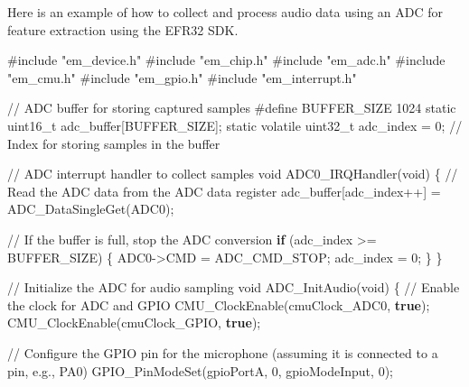 \documentclass[
  9pt,
  letterpaper,
  abstract,
  titlepage]{scrbook}
\newenvironment{Shaded}{\begin{snugshade}}{\end{snugshade}}
\newcommand{\CommentTok}[1]{\textcolor[rgb]{0.37,0.37,0.37}{#1}}
\newcommand{\ControlFlowTok}[1]{\textcolor[rgb]{0.00,0.23,0.31}{\textbf{#1}}}
\newcommand{\DataTypeTok}[1]{\textcolor[rgb]{0.68,0.00,0.00}{#1}}
\newcommand{\DecValTok}[1]{\textcolor[rgb]{0.68,0.00,0.00}{#1}}
\newcommand{\ImportTok}[1]{\textcolor[rgb]{0.00,0.46,0.62}{#1}}
\newcommand{\KeywordTok}[1]{\textcolor[rgb]{0.00,0.23,0.31}{\textbf{#1}}}
\newcommand{\NormalTok}[1]{\textcolor[rgb]{0.00,0.23,0.31}{#1}}
\newcommand{\OperatorTok}[1]{\textcolor[rgb]{0.37,0.37,0.37}{#1}}
\newcommand{\PreprocessorTok}[1]{\textcolor[rgb]{0.68,0.00,0.00}{#1}}
\begin{document}
Here is an example of how to collect and process audio data using an ADC
for feature extraction using the EFR32 SDK.

\begin{Shaded}
\begin{Highlighting}[]
\PreprocessorTok{\#include }\ImportTok{"em\_device.h"}
\PreprocessorTok{\#include }\ImportTok{"em\_chip.h"}
\PreprocessorTok{\#include }\ImportTok{"em\_adc.h"}
\PreprocessorTok{\#include }\ImportTok{"em\_cmu.h"}
\PreprocessorTok{\#include }\ImportTok{"em\_gpio.h"}
\PreprocessorTok{\#include }\ImportTok{"em\_interrupt.h"}

\CommentTok{// ADC buffer for storing captured samples}
\PreprocessorTok{\#define BUFFER\_SIZE }\DecValTok{1024}
\DataTypeTok{static} \DataTypeTok{uint16\_t}\NormalTok{ adc\_buffer}\OperatorTok{[}\NormalTok{BUFFER\_SIZE}\OperatorTok{];}
\DataTypeTok{static} \DataTypeTok{volatile} \DataTypeTok{uint32\_t}\NormalTok{ adc\_index }\OperatorTok{=} \DecValTok{0}\OperatorTok{;}  \CommentTok{// Index for storing samples in the buffer}

\CommentTok{// ADC interrupt handler to collect samples}
\DataTypeTok{void}\NormalTok{ ADC0\_IRQHandler}\OperatorTok{(}\DataTypeTok{void}\OperatorTok{)} \OperatorTok{\{}
    \CommentTok{// Read the ADC data from the ADC data register}
\NormalTok{    adc\_buffer}\OperatorTok{[}\NormalTok{adc\_index}\OperatorTok{++]} \OperatorTok{=}\NormalTok{ ADC\_DataSingleGet}\OperatorTok{(}\NormalTok{ADC0}\OperatorTok{);}

    \CommentTok{// If the buffer is full, stop the ADC conversion}
    \ControlFlowTok{if} \OperatorTok{(}\NormalTok{adc\_index }\OperatorTok{\textgreater{}=}\NormalTok{ BUFFER\_SIZE}\OperatorTok{)} \OperatorTok{\{}
\NormalTok{        ADC0}\OperatorTok{{-}\textgreater{}}\NormalTok{CMD }\OperatorTok{=}\NormalTok{ ADC\_CMD\_STOP}\OperatorTok{;}
\NormalTok{        adc\_index }\OperatorTok{=} \DecValTok{0}\OperatorTok{;}
    \OperatorTok{\}}
\OperatorTok{\}}

\CommentTok{// Initialize the ADC for audio sampling}
\DataTypeTok{void}\NormalTok{ ADC\_InitAudio}\OperatorTok{(}\DataTypeTok{void}\OperatorTok{)} \OperatorTok{\{}
    \CommentTok{// Enable the clock for ADC and GPIO}
\NormalTok{    CMU\_ClockEnable}\OperatorTok{(}\NormalTok{cmuClock\_ADC0}\OperatorTok{,} \KeywordTok{true}\OperatorTok{);}
\NormalTok{    CMU\_ClockEnable}\OperatorTok{(}\NormalTok{cmuClock\_GPIO}\OperatorTok{,} \KeywordTok{true}\OperatorTok{);}

    \CommentTok{// Configure the GPIO pin for the microphone (assuming it is connected to a pin, e.g., PA0)}
\NormalTok{    GPIO\_PinModeSet}\OperatorTok{(}\NormalTok{gpioPortA}\OperatorTok{,} \DecValTok{0}\OperatorTok{,}\NormalTok{ gpioModeInput}\OperatorTok{,} \DecValTok{0}\OperatorTok{);}


\end{Highlighting}
\end{Shaded}
\end{document}
